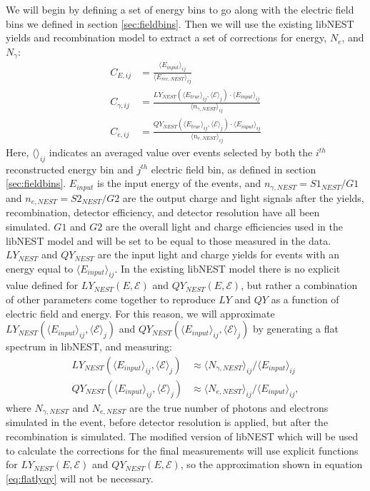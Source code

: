 We will begin by defining a set of energy bins to go along with the electric field bins we defined in section \ref{sec:fieldbins}. Then we will use the existing libNEST yields and recombination model to extract a set of corrections for energy, $N_e$, and $N_{\gamma}$:
\begin{align}
\label{eq:nestEcorr}C_{E,ij}&=\frac{\langle E_{input} \rangle_{ij}}{\langle E_{rec,NEST} \rangle_{ij}} \\[1em]
\label{eq:nestS1corr}C_{\gamma,ij}&=\frac{LY_{NEST}(\langle E_{true} \rangle_{ij},\langle \mathcal{E} \rangle_j)\cdot \langle E_{input} \rangle_{ij}}{\langle n_{\gamma,NEST} \rangle_{ij}} \\[1em]
\label{eq:nestS2corr}C_{e,ij}&=\frac{QY_{NEST}(\langle E_{true} \rangle_{ij},\langle \mathcal{E} \rangle_j)\cdot \langle E_{input} \rangle_{ij}}{\langle n_{e,NEST} \rangle_{ij}} 
\end{align}
Here, $\langle \rangle_{ij}$ indicates an averaged value over events selected by both the $i^{th}$ reconstructed energy bin and $j^{th}$ electric field bin, as defined in section \ref{sec:fieldbins}. $E_{input}$ is the input energy of the events, and $n_{\gamma,NEST}=S1_{NEST}/G1$ and $n_{e,NEST}=S2_{NEST}/G2$ are the output charge and light signals after the yields, recombination, detector efficiency, and detector resolution have all been simulated. $G1$ and $G2$ are the overall light and charge efficiencies used in the libNEST model and will be set to be equal to those measured in the data. $LY_{NEST}$ and $QY_{NEST}$ are the input light and charge yields for events with an energy equal to $\langle E_{input} \rangle_{ij}$. In the existing libNEST model there is no explicit value defined for $LY_{NEST}(E,\mathcal{E})$ and $QY_{NEST}(E,\mathcal{E})$, but rather a combination of other parameters come together to reproduce $LY$ and $QY$ as a function of electric field and energy. For this reason, we will approximate $LY_{NEST}(\langle E_{input} \rangle_{ij},\langle \mathcal{E} \rangle_j)$ and $QY_{NEST}(\langle E_{input} \rangle_{ij},\langle \mathcal{E} \rangle_j)$ by generating a flat spectrum in libNEST, and measuring: 
\begin{equation}\label{eq:flatlyqy}
\begin{split}
LY_{NEST}(\langle E_{input} \rangle_{ij},\langle \mathcal{E} \rangle_j) &\approx \langle N_{\gamma,NEST} \rangle_{ij}/\langle E_{input} \rangle_{ij}\\ 
QY_{NEST}(\langle E_{input} \rangle_{ij},\langle \mathcal{E} \rangle_j) &\approx \langle N_{e,NEST} \rangle_{ij}/\langle E_{input} \rangle_{ij},
\end{split}
\end{equation}
where $N_{\gamma,NEST}$ and $N_{e,NEST}$ are the true number of photons and electrons simulated in the event, before detector resolution is applied, but after the recombination is simulated. The modified version of libNEST which will be used to calculate the corrections for the final measurements will use explicit functions for $LY_{NEST}(E,\mathcal{E})$ and $QY_{NEST}(E,\mathcal{E})$, so the approximation shown in equation \ref{eq:flatlyqy} will not be necessary.

